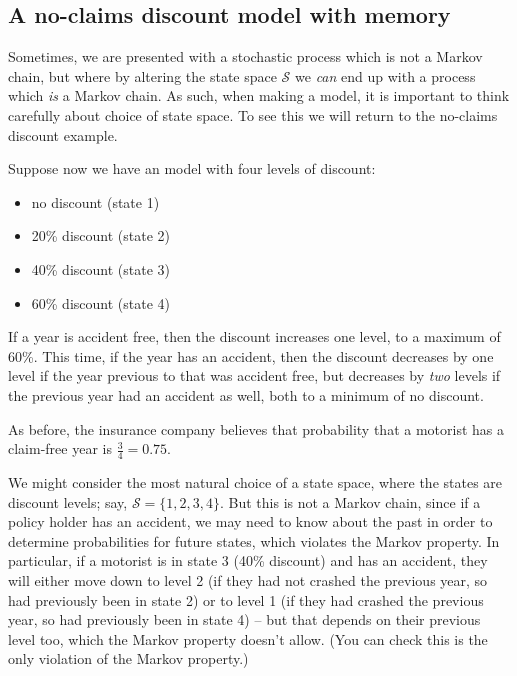 \documentclass[
  a4paper,
]{article}
\providecommand{\tightlist}{%
  \setlength{\itemsep}{0pt}\setlength{\parskip}{0pt}}
\theoremstyle{definition}
\theoremstyle{definition}
\theoremstyle{definition}
\theoremstyle{remark}
\begin{document}
\hypertarget{S06-example3}{%
\subsection{A no-claims discount model with memory}\label{S06-example3}}

Sometimes, we are presented with a stochastic process which is not a Markov chain, but where by altering the state space \(\mathcal{S}\) we \emph{can} end up with a process which \emph{is} a Markov chain. As such, when making a model, it is important to think carefully about choice of state space. To see this we will return to the no-claims discount example.

Suppose now we have an model with four levels of discount:

\begin{itemize}
\tightlist
\item
  no discount (state 1)
\item
  20\% discount (state 2)
\item
  40\% discount (state 3)
\item
  60\% discount (state 4)
\end{itemize}

If a year is accident free, then the discount increases one level, to a maximum of 60\%. This time, if the year has an accident, then the discount decreases by one level if the year previous to that was accident free, but decreases by \emph{two} levels if the previous year had an accident as well, both to a minimum of no discount.

As before, the insurance company believes that probability that a motorist has a claim-free year is \(\frac34 = 0.75\).

We might consider the most natural choice of a state space, where the states are discount levels; say, \(\mathcal{S}=\{1,2,3,4\}\). But this is not a Markov chain, since if a policy holder has an accident, we may need to know about the past in order to determine probabilities for future states, which violates the Markov property. In particular, if a motorist is in state 3 (40\% discount) and has an accident, they will either move down to level 2 (if they had not crashed the previous year, so had previously been in state 2) or to level 1 (if they had crashed the previous year, so had previously been in state 4) -- but that depends on their previous level too, which the Markov property doesn't allow. (You can check this is the only violation of the Markov property.)
\end{document}
